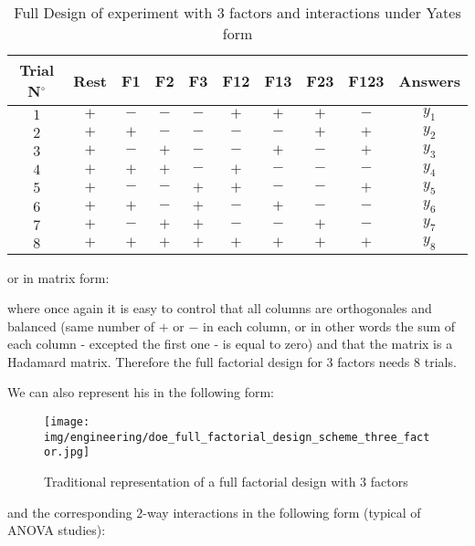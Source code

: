 	\begin{table}[H]\centering
	\begin{center}
			\begin{tabular}{|c|c|c|c|c|c|c|c|c|c|}
				\hline
				\multicolumn{1}{c}{\cellcolor{black!30}\textbf{Trial N${}^\circ$}} & 
  \multicolumn{1}{c}{\cellcolor{black!30}\textbf{Rest}} & 
  \multicolumn{1}{c}{\cellcolor{black!30}\textbf{F1}} & 
  \multicolumn{1}{c}{\cellcolor{black!30}\textbf{F2}} & 
  \multicolumn{1}{c}{\cellcolor{black!30}\textbf{F3}} & 
  \multicolumn{1}{c}{\cellcolor{black!30}\textbf{F12}} & 
  \multicolumn{1}{c}{\cellcolor{black!30}\textbf{F13}} & 
  \multicolumn{1}{c}{\cellcolor{black!30}\textbf{F23}} & 
  \multicolumn{1}{c}{\cellcolor{black!30}\textbf{F123}} & 
  \multicolumn{1}{c}{\cellcolor{black!30}\textbf{Answers}}\\ \hline
				$1$ & $+$ & $-$ & $-$ & $-$ & $+$ & $+$ & $+$ & $-$ & $y_1$\\ \hline
				$2$ & $+$ & $+$ & $-$ & $-$ & $-$ & $-$ & $+$ & $+$ & $y_2$\\ \hline
				$3$ & $+$ & $-$ & $+$ & $-$ & $-$ & $+$ & $-$ & $+$ & $y_3$\\ \hline
				$4$ & $+$ & $+$ & $+$ & $-$ & $+$ & $-$ & $-$ & $-$ & $y_4$\\ \hline
				$5$ & $+$ & $-$ & $-$ & $+$ & $+$ & $-$ & $-$ & $+$ & $y_5$\\ \hline
				$6$ & $+$ & $+$ & $-$ & $+$ & $-$ & $+$ & $-$ & $-$ & $y_6$\\ \hline
				$7$ & $+$ & $-$ & $+$ & $+$ & $-$ & $-$ & $+$ & $-$ & $y_7$\\ \hline
				$8$ & $+$ & $+$ & $+$ & $+$ & $+$ & $+$ & $+$ & $+$ & $y_8$\\ \hline
 		\end{tabular}
	\end{center}
	\caption{Full Design of experiment with $3$ factors and interactions under Yates form}
	\end{table}
	or in matrix form:
	
	where once again it is easy to control that all columns are orthogonales and balanced (same number of $+$ or $-$ in each column, or in other words the sum of each column - excepted the first one - is equal to zero) and that the matrix is a Hadamard matrix.	 Therefore the full factorial design for $3$ factors needs $8$ trials.

	We can also represent his in the following form:
	\begin{figure}[H]
		\begin{center}
		\texttt{[image: img/engineering/doe\_full\_factorial\_design\_scheme\_three\_factor.jpg]}
		\end{center}	
		\caption{Traditional representation of a full factorial design with $3$ factors}
	\end{figure}
	and the corresponding $2$-way interactions in the following form (typical of ANOVA studies):
	\newcommand\drawplane[2]
	{%
	    \draw
	    [
	        thick,
	        opacity=.6,
	        draw=#2,
	        fill=#2!60,
	    ] #1 -- cycle;%
	}
	
